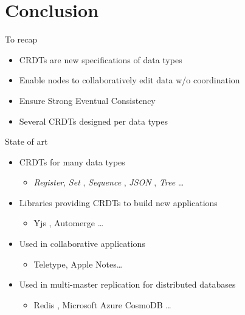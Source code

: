 \section{Conclusion}

\begin{frame}{To recap}
    \begin{itemize}
        \item CRDTs are new specifications of data types
        \item Enable nodes to collaboratively edit data w/o coordination
        \item Ensure Strong Eventual Consistency
        \item Several CRDTs designed per data types
    \end{itemize}
\end{frame}

\begin{frame}{State of art}
    \begin{itemize}
        \item CRDTs for many data types
        \begin{itemize}
            \item \emph{Register}, \emph{Set} \cite{2018-crdts-overview-preguica}, \emph{Sequence} \cite{ROH2011354,2009-logoot-weiss}, \emph{JSON} \cite{jsoncrdt2017}, \emph{Tree} \cite{2022-tree-crdt-kleppmann} \dots
        \end{itemize}
        \item Libraries providing CRDTs to build new applications
        \begin{itemize}
            \item Yjs \cite{yjsimplem}, Automerge \cite{automerge}\dots
        \end{itemize}
        \pause
        \item Used in collaborative applications
        \begin{itemize}
            \item Teletype, Apple Notes\dots
        \end{itemize}
        \item Used in multi-master replication for distributed databases
        \begin{itemize}
            \item Redis \cite{RedisEnterpriseActiveActiveGeoDistribution}, Microsoft Azure CosmoDB \cite{AzureCosmosDB}\dots
        \end{itemize}
    \end{itemize}
\end{frame}

